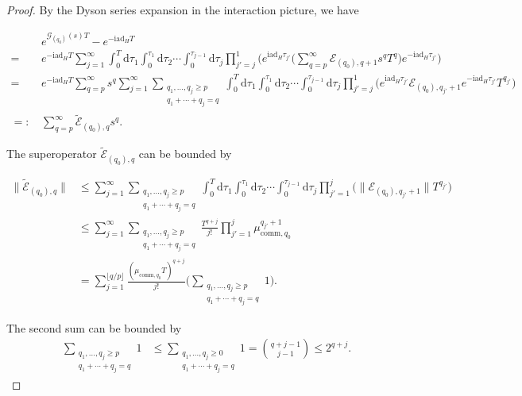 \documentclass[aps,pra,reprint,groupedaddress,floatfix]{revtex4-2}
\renewcommand{\i}{\mathrm{i}}
\renewcommand{\d}{\mathrm{d}}
\newcommand{\ad}{\mathrm{ad}}
\newcommand{\G}{\mathcal{G}}
\newcommand{\E}{\mathcal{E}}
\begin{document}
\begin{proof}
	By the Dyson series expansion in the interaction picture, we have 
    \begin{widetext}
	\begin{align*}
    &e^{\G_{(q_0)}(s) T}-e^{-\i \ad_H T} \\
    = \ & e^{-\i \ad_H T}  \sum_{j=1}^{\infty} \int_{0}^T \d \tau_1 \int_{0}^{\tau_1}\d \tau_2 \cdots \int_{0}^{\tau_{j-1}}\d \tau_j \prod_{j'=j}^{1}\bigg(e^{\i\ad_H \tau_{j'}}\bigg(\sum_{q=p}^{\infty}\E_{(q_0),q+1}s^qT^q\bigg)e^{-\i \ad_H \tau_{j'}}\bigg) \\
    = \ &  e^{-\i \ad_H T}\sum_{q=p}^{\infty}s^{q} \sum_{j=1}^{\infty} \sum_{\substack{q_1,\ldots,q_j \ge p \\ q_1+\cdots+q_j=q}} \int_{0}^T \d \tau_1 \int_{0}^{\tau_1}\d \tau_2 \cdots \int_{0}^{\tau_{j-1}}\d \tau_j \prod_{j'=j}^{1}\bigg(e^{\i\ad_H \tau_{j'}}\E_{(q_0),q_{j'}+1}e^{-\i \ad_H \tau_{j'}}T^{q_{j'}}\bigg)\\
    =:\,& \sum_{q=p}^{\infty}\tilde{\E}_{(q_0),q} s^q.   
	\end{align*}
    \end{widetext}
	The superoperator $\tilde{\E}_{(q_0),q}$ can be bounded by
    \begin{widetext}
    \begin{align*}
    \big\|\tilde{\E}_{(q_0),q}\big\|&\le \sum_{j=1}^{\infty} \sum_{\substack{q_1,\ldots,q_j \ge p \\ q_1+\cdots+q_j=q}} \int_{0}^T \d \tau_1 \int_{0}^{\tau_1}\d \tau_2 \cdots \int_{0}^{\tau_{j-1}}\d \tau_j \prod_{j'=1}^{j}\big(\big\|\E_{(q_0),q_{j'}+1}\big\|T^{q_{j'}}\big) \\
    &\le  \sum_{j=1}^{\infty} \sum_{\substack{q_1,\ldots,q_j \ge p \\ q_1+\cdots+q_j=q}}\frac{T^{q+j}}{j!}\prod_{j'=1}^{j}\mu_{\mathrm{comm},q_0}^{q_{j'}+1} \\
	    &=\sum_{j=1}^{\lfloor q/p\rfloor }\frac{(\mu_{\mathrm{comm},q_0}T)^{q+j}}{j!}\Big(\sum_{\substack{q_1,\ldots,q_j \ge p \\ q_1+\cdots+q_j=q}} 1\Big).
	\end{align*}
    \end{widetext}
The second sum can be bounded by \begin{align*}
    \sum_{\substack{q_1,\ldots,q_j \ge p \\ q_1+\cdots+q_j=q}} 1 &\le \sum_{\substack{ q_1,\ldots,q_j \ge 0 \\ q_1+\cdots+q_j=q}} 1=\binom{q+j-1}{j-1} \le 2^{q+j}.

\end{align*}
\end{proof}
\end{document}
